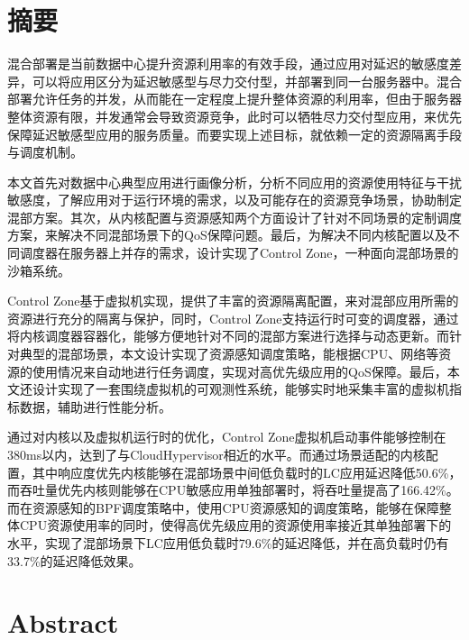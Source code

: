 
\maketitle%
\MAKETITLE%
\makedeclaration%
\intobmk\chapter*{摘\quad 要}%
\setcounter{page}{1}%


混合部署是当前数据中心提升资源利用率的有效手段，通过应用对延迟的敏感度差异，可以将应用区分为延迟敏感型与尽力交付型，并部署到同一台服务器中。混合部署允许任务的并发，从而能在一定程度上提升整体资源的利用率，但由于服务器整体资源有限，并发通常会导致资源竞争，此时可以牺牲尽力交付型应用，来优先保障延迟敏感型应用的服务质量。而要实现上述目标，就依赖一定的资源隔离手段与调度机制。

本文首先对数据中心典型应用进行画像分析，分析不同应用的资源使用特征与干扰敏感度，了解应用对于运行环境的需求，以及可能存在的资源竞争场景，协助制定混部方案。其次，从内核配置与资源感知两个方面设计了针对不同场景的定制调度方案，来解决不同混部场景下的QoS保障问题。最后，为解决不同内核配置以及不同调度器在服务器上并存的需求，设计实现了Control Zone，一种面向混部场景的沙箱系统。

Control Zone基于虚拟机实现，提供了丰富的资源隔离配置，来对混部应用所需的资源进行充分的隔离与保护，同时，Control Zone支持运行时可变的调度器，通过将内核调度器容器化，能够方便地针对不同的混部方案进行选择与动态更新。而针对典型的混部场景，本文设计实现了资源感知调度策略，能根据CPU、网络等资源的使用情况来自动地进行任务调度，实现对高优先级应用的QoS保障。最后，本文还设计实现了一套围绕虚拟机的可观测性系统，能够实时地采集丰富的虚拟机指标数据，辅助进行性能分析。


通过对内核以及虚拟机运行时的优化，Control Zone虚拟机启动事件能够控制在380ms以内，达到了与CloudHypervisor相近的水平。而通过场景适配的内核配置，其中响应度优先内核能够在混部场景中间低负载时的LC应用延迟降低50.6\%，而吞吐量优先内核则能够在CPU敏感应用单独部署时，将吞吐量提高了166.42\%。而在资源感知的BPF调度策略中，使用CPU资源感知的调度策略，能够在保障整体CPU资源使用率的同时，使得高优先级应用的资源使用率接近其单独部署下的水平，实现了混部场景下LC应用低负载时79.6\%的延迟降低，并在高负载时仍有33.7\%的延迟降低效果。

\intobmk\chapter*{Abstract}%



\KEYWORDS{}%

\pagestyle{enfrontmatterstyle}%
\cleardoublepage\pagestyle{frontmatterstyle}%

